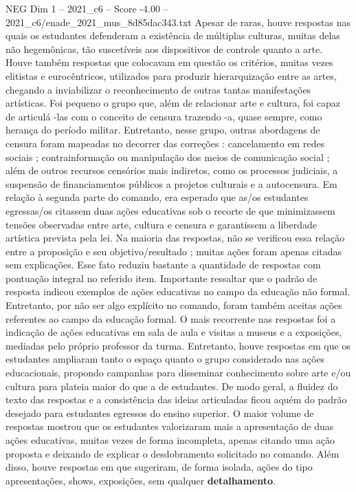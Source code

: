 \begin{textsample}{NEG Dim 1 – 2021\_c6 – Score -4.00 – 2021\_c6/enade\_2021\_mus\_8d85dac343.txt}
Apesar de raras, houve respostas nas quais os estudantes defenderam a existência de múltiplas culturas, muitas delas não hegemônicas, tão suscetíveis aos dispositivos de controle quanto a arte.
Houve também respostas que colocavam em questão os critérios, muitas vezes elitistas e eurocêntricos, utilizados para produzir hierarquização entre as artes, chegando a inviabilizar o reconhecimento de outras tantas manifestações artísticas.
Foi pequeno o grupo que, além de relacionar arte e cultura, foi capaz de articulá -las com o conceito de censura trazendo -a, quase sempre, como herança do período militar.
Entretanto, nesse grupo, outras abordagens de censura foram mapeadas no decorrer das correções : cancelamento em redes sociais ; contrainformação ou manipulação dos meios de comunicação social ; além de outros recursos censórios mais indiretos, como os processos judiciais, a suspensão de financiamentos públicos a projetos culturais e a autocensura.
Em relação à segunda parte do comando, era esperado que as/os estudantes egressas/os citassem duas ações educativas sob o recorte de que minimizassem tensões observadas entre arte, cultura e censura e garantissem a liberdade artística prevista pela lei.
Na maioria das respostas, não se verificou essa relação entre a proposição e seu objetivo/resultado ; muitas ações foram apenas citadas sem explicações.
Esse fato reduziu bastante a quantidade de respostas com pontuação integral no referido item.
Importante ressaltar que o padrão de resposta indicou exemplos de ações educativas no campo da educação não formal.
Entretanto, por não ser algo explícito no comando, foram também aceitas ações referentes ao campo da educação formal.
O mais recorrente nas respostas foi a indicação de ações educativas em sala de aula e visitas a museus e a exposições, mediadas pelo próprio professor da turma.
Entretanto, houve respostas em que os estudantes ampliaram tanto o espaço quanto o grupo considerado nas ações educacionais, propondo campanhas para disseminar conhecimento sobre arte e/ou cultura para plateia maior do que a de estudantes.
De modo geral, a fluidez do texto das respostas e a consistência das ideias articuladas ficou aquém do padrão desejado para estudantes egressos do ensino superior.
O maior volume de respostas mostrou que os estudantes valorizaram mais a apresentação de duas ações educativas, muitas vezes de forma incompleta, apenas citando uma ação proposta e deixando de explicar o desdobramento solicitado no comando.
Além disso, houve respostas em que sugeriram, de forma isolada, ações do tipo apresentações, shows, exposições, sem qualquer \textbf{detalhamento}.

\end{textsample}
